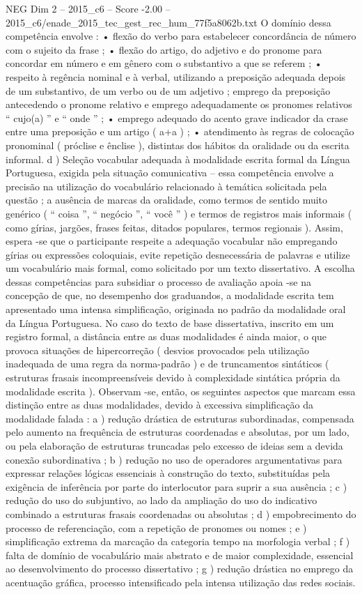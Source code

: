 \begin{textsample}{NEG Dim 2 – 2015\_c6 – Score -2.00 – 2015\_c6/enade\_2015\_tec\_gest\_rec\_hum\_77f5a8062b.txt}
O domínio dessa competência envolve : • flexão do verbo para estabelecer concordância de número com o sujeito da frase ; • flexão do artigo, do adjetivo e do pronome para concordar em número e em gênero com o substantivo a que se referem ; • respeito à regência nominal e à verbal, utilizando a preposição adequada depois de um substantivo, de um verbo ou de um adjetivo ; emprego da preposição antecedendo o pronome relativo e emprego adequadamente os pronomes relativos “ cujo(a) ” e “ onde ” ; • emprego adequado do acento grave indicador da crase entre uma preposição e um artigo ( a+a ) ; • atendimento às regras de colocação pronominal ( próclise e ênclise ), distintas dos hábitos da oralidade ou da escrita informal. d ) Seleção vocabular adequada à modalidade escrita formal da Língua Portuguesa, exigida pela situação comunicativa – essa competência envolve a precisão na utilização do vocabulário relacionado à temática solicitada pela questão ; a ausência de marcas da oralidade, como termos de sentido muito genérico ( “ coisa ”, “ negócio ”, “ você ” ) e termos de registros mais informais ( como gírias, jargões, frases feitas, ditados populares, termos regionais ).
Assim, espera -se que o participante respeite a adequação vocabular não empregando gírias ou expressões coloquiais, evite repetição desnecessária de palavras e utilize um vocabulário mais formal, como solicitado por um texto dissertativo.
A escolha dessas competências para subsidiar o processo de avaliação apoia -se na concepção de que, no desempenho dos graduandos, a modalidade escrita tem apresentado uma intensa simplificação, originada no padrão da modalidade oral da Língua Portuguesa.
No caso do texto de base dissertativa, inscrito em um registro formal, a distância entre as duas modalidades é ainda maior, o que provoca situações de hipercorreção ( desvios provocados pela utilização inadequada de uma regra da norma-padrão ) e de truncamentos sintáticos ( estruturas frasais incompreensíveis devido à complexidade sintática própria da modalidade escrita ).
Observam -se, então, os seguintes aspectos que marcam essa distinção entre as duas modalidades, devido à excessiva simplificação da modalidade falada : a ) redução drástica de estruturas subordinadas, compensada pelo aumento na frequência de estruturas coordenadas e absolutas, por um lado, ou pela elaboração de estruturas truncadas pelo excesso de ideias sem a devida conexão subordinativa ; b ) redução no uso de operadores argumentativas para expressar relações lógicas essenciais à construção do texto, substituídas pela exigência de inferência por parte do interlocutor para suprir a sua ausência ; c ) redução do uso do subjuntivo, ao lado da ampliação do uso do indicativo combinado a estruturas frasais coordenadas ou absolutas ; d ) empobrecimento do processo de referenciação, com a repetição de pronomes ou nomes ; e ) simplificação extrema da marcação da categoria tempo na morfologia verbal ; f ) falta de domínio de vocabulário mais abstrato e de maior complexidade, essencial ao desenvolvimento do processo dissertativo ; g ) redução drástica no emprego da acentuação gráfica, processo intensificado pela intensa utilização das redes sociais.

\end{textsample}
